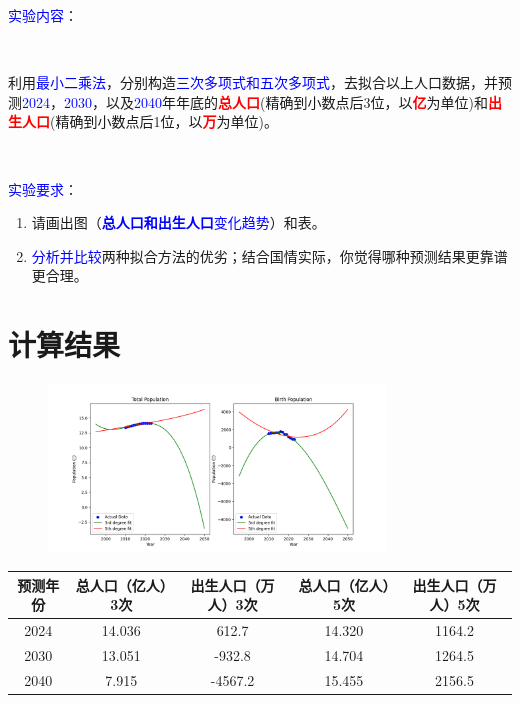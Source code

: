 \documentclass[10pt]{article}
\begin{document}
\textcolor{blue}{实验内容}：

$ $

利用\textcolor{blue}{最小二乘法}，分别构造\textcolor{blue}{三次多项式和五次多项式}，去拟合以上人口数据，并预测\textcolor{blue}{2024}，\textcolor{blue}{2030}，以及\textcolor{blue}{2040}年年底的\textcolor{red}{\textbf{总人口}}(精确到小数点后3位，以\textcolor{red}{\textbf{亿}}为单位)和\textcolor{red}{\textbf{出生人口}}(精确到小数点后1位，以\textcolor{red}{\textbf{万}}为单位)。

$ $

\textcolor{blue}{实验要求}：

\begin{enumerate}
  \item 请画出图（\textcolor{blue}{\textbf{总人口和出生人口}变化趋势}）和表。
  \item \textcolor{blue}{分析并比较}两种拟合方法的优劣；结合国情实际，你觉得哪种预测结果更靠谱更合理。
\end{enumerate}

\newpage

\section{计算结果}

\begin{figure}[H]
  \centering
  \includegraphics[width=0.8\textwidth]{Figure_1.png}
\end{figure}

\begin{table}[H]
  \begin{tabular}{|c|c|c|c|c|}
    \hline
    预测年份&总人口（亿人）3次&出生人口（万人）3次&总人口（亿人）5次&出生人口（万人）5次\\
    \hline
    2024& 14.036&612.7&14.320&1164.2\\
    \hline
    2030& 13.051&-932.8&14.704&1264.5 \\
    \hline
    2040& 7.915&-4567.2&15.455&2156.5 \\
    \hline
  \end{tabular}
\end{table}
\end{document}
